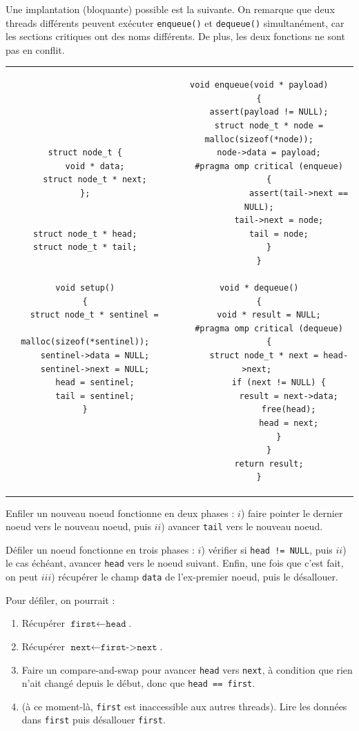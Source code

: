 Une implantation (bloquante) possible est la suivante. On remarque que deux
threads différents peuvent exécuter \texttt{enqueue()} et \texttt{dequeue()}
simultanément, car les sections critiques ont des noms différents. De plus, les
deux fonctions ne sont pas en conflit.

\begin{tabular}{c|c}
\begin{minipage}[t]{0.48\textwidth}
  \begin{verbatim}
struct node_t {
	void * data;
	struct node_t * next;
};


struct node_t * head;
struct node_t * tail;


void setup()
{
	struct node_t * sentinel = 
		malloc(sizeof(*sentinel));
	sentinel->data = NULL;
	sentinel->next = NULL;
	head = sentinel;
	tail = sentinel;
}
\end{verbatim}
\end{minipage}
&
\begin{minipage}[t]{0.48\textwidth}
\begin{verbatim}
void enqueue(void * payload)
{
	assert(payload != NULL);
	struct node_t * node = malloc(sizeof(*node));
	node->data = payload;
	#pragma omp critical (enqueue)
	{
                assert(tail->next == NULL);
		tail->next = node;
		tail = node;
	}
}

void * dequeue()
{
	void * result = NULL;
	#pragma omp critical (dequeue)
	{
		struct node_t * next = head->next; 
		if (next != NULL) {
			result = next->data;
			free(head);
			head = next;
		}
	}
	return result;
}
\end{verbatim}
\end{minipage}
\end{tabular}

Enfiler un nouveau noeud fonctionne en deux phases : $i$) faire pointer le
dernier noeud vers le nouveau noeud, puis $ii$) avancer \texttt{tail} vers le
nouveau noeud.

Défiler un noeud fonctionne en trois phases : $i$) vérifier si \texttt{head !=
  NULL}, puis $ii$) le cas échéant, avancer \texttt{head} vers le noeud
suivant. Enfin, une fois que c'est fait, on peut $iii$) récupérer le champ
\texttt{data} de l'ex-premier noeud, puis le désallouer.

Pour défiler, on pourrait :
\begin{enumerate}
\item Récupérer $\texttt{first} \gets \texttt{head}$.
\item Récupérer $\texttt{next} \gets \texttt{first->next}$.
\item Faire un compare-and-swap pour avancer \texttt{head} vers \texttt{next}, à condition que rien n'ait changé depuis le début, donc que \texttt{head == first}.
\item (à ce moment-là, \texttt{first} est inaccessible aux autres threads). Lire
  les données dans \texttt{first} puis désallouer \texttt{first}.
\end{enumerate}  

